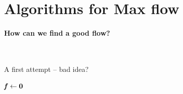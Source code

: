 
\section{Algorithms for Max flow}
\paragraph{How can we find a good flow?}\ \newline

\begin{algorithm}[H]
\caption{A first attempt -- bad idea?}
\SetAlgoLined

 \(\boldsymbol{\mathit{f}} \leftarrow \boldsymbol{0}\)\;
\end{algorithm}

